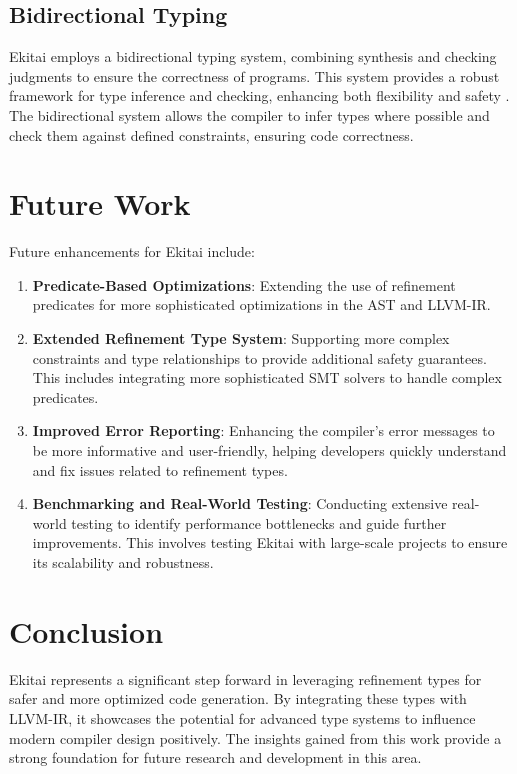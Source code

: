 \documentclass[12pt]{article}
\begin{document}
\subsection{Bidirectional Typing}

Ekitai employs a bidirectional typing system, combining synthesis and checking judgments to ensure the correctness of programs. This system provides a robust framework for type inference and checking, enhancing both flexibility and safety \cite{pierce2002}. The bidirectional system allows the compiler to infer types where possible and check them against defined constraints, ensuring code correctness.

\section{Future Work}

Future enhancements for Ekitai include:
\begin{enumerate}
    \item \textbf{Predicate-Based Optimizations}: Extending the use of refinement predicates for more sophisticated optimizations in the AST and LLVM-IR.
    \item \textbf{Extended Refinement Type System}: Supporting more complex constraints and type relationships to provide additional safety guarantees. This includes integrating more sophisticated SMT solvers to handle complex predicates.
    \item \textbf{Improved Error Reporting}: Enhancing the compiler's error messages to be more informative and user-friendly, helping developers quickly understand and fix issues related to refinement types.
    \item \textbf{Benchmarking and Real-World Testing}: Conducting extensive real-world testing to identify performance bottlenecks and guide further improvements. This involves testing Ekitai with large-scale projects to ensure its scalability and robustness.
\end{enumerate}

\section{Conclusion}

Ekitai represents a significant step forward in leveraging refinement types for safer and more optimized code generation. By integrating these types with LLVM-IR, it showcases the potential for advanced type systems to influence modern compiler design positively. The insights gained from this work provide a strong foundation for future research and development in this area.
\end{document}
